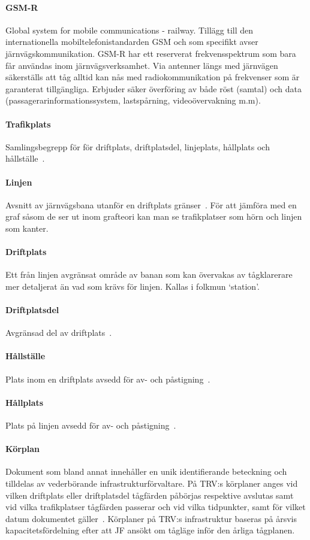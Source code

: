 \paragraph{GSM-R}
Global system for mobile communications - railway.
Tillägg till den internationella mobiltelefonistandarden GSM och som specifikt avser järnvägskommunikation.
GSM-R har ett reserverat frekvensspektrum som bara får användas inom järnvägsverksamhet.
Via antenner längs med järnvägen säkerställs att tåg alltid kan nås med radiokommunikation på frekvenser som är garanterat tillgängliga.
Erbjuder säker överföring av både röst (samtal) och data (passagerarinformationssystem, lastspårning, videoövervakning m.m).
~\cite{Malux2019}
\paragraph{Trafikplats}
Samlingsbegrepp för för driftplats, driftplatsdel, linjeplats, hållplats och hållställe~\cite{TTJ2015}.
\paragraph{Linjen}
Avsnitt av järnvägsbana utanför en driftplats gränser~\cite{TTJ2015}.
För att jämföra med en graf såsom de ser ut inom grafteori kan man se trafikplatser som hörn och linjen som kanter.
\paragraph{Driftplats}
Ett från linjen avgränsat område av banan som kan övervakas av tågklarerare mer detaljerat än vad som krävs för linjen.
Kallas i folkmun \lq{}station\rq{}.
\paragraph{Driftplatsdel}
Avgränsad del av driftplats~\cite{TTJ2015}.
\paragraph{Hållställe}
Plats inom en driftplats avsedd för av- och påstigning~\cite{TTJ2015}.
\paragraph{Hållplats}
Plats på linjen avsedd för av- och påstigning~\cite{TTJ2015}.
\paragraph{Körplan}
Dokument som bland annat innehåller en unik identifierande beteckning och tilldelas av vederbörande infrastrukturförvaltare.
På TRV:s körplaner anges vid vilken driftplats eller driftplatsdel tågfärden påbörjas respektive avslutas samt vid vilka trafikplatser tågfärden passerar och vid vilka tidpunkter, samt för vilket datum dokumentet gäller~\cite{TTJ2015}.
Körplaner på TRV:s infrastruktur baseras på årsvis kapacitetsfördelning efter att JF ansökt om tågläge inför den årliga tågplanen.
